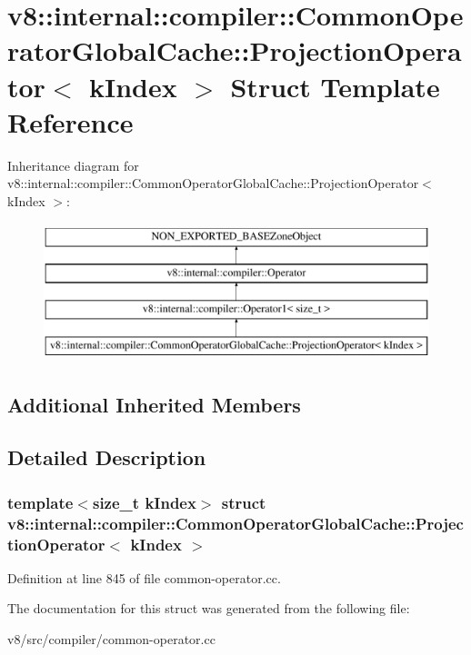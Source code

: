 \hypertarget{structv8_1_1internal_1_1compiler_1_1CommonOperatorGlobalCache_1_1ProjectionOperator}{}\section{v8\+:\+:internal\+:\+:compiler\+:\+:Common\+Operator\+Global\+Cache\+:\+:Projection\+Operator$<$ k\+Index $>$ Struct Template Reference}
\label{structv8_1_1internal_1_1compiler_1_1CommonOperatorGlobalCache_1_1ProjectionOperator}
Inheritance diagram for v8\+:\+:internal\+:\+:compiler\+:\+:Common\+Operator\+Global\+Cache\+:\+:Projection\+Operator$<$ k\+Index $>$\+:\begin{figure}[H]
\begin{center}
\leavevmode
\includegraphics[height=4.000000cm]{structv8_1_1internal_1_1compiler_1_1CommonOperatorGlobalCache_1_1ProjectionOperator}
\end{center}
\end{figure}
\subsection*{Additional Inherited Members}


\subsection{Detailed Description}
\subsubsection*{template$<$size\+\_\+t k\+Index$>$\newline
struct v8\+::internal\+::compiler\+::\+Common\+Operator\+Global\+Cache\+::\+Projection\+Operator$<$ k\+Index $>$}



Definition at line 845 of file common-\/operator.\+cc.



The documentation for this struct was generated from the following file\+:\begin{DoxyCompactItemize}
\item 
v8/src/compiler/common-\/operator.\+cc\end{DoxyCompactItemize}
